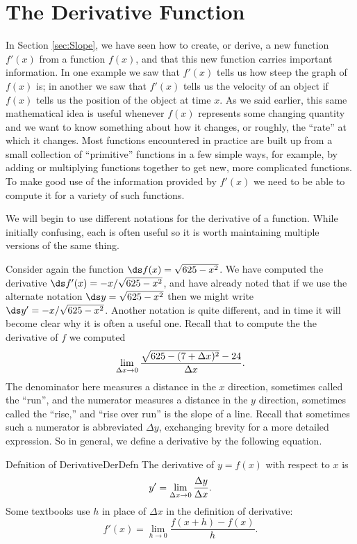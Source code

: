 \section{The Derivative Function}\label{sec:TheDerivativeFunction}
In Section \ref{sec:Slope}, we have seen how to create, or derive, a new function $f'(x)$ from a
function $f(x)$, and that this new function carries important
information. In one example we saw that $f'(x)$ tells us how steep the
graph of $f(x)$ is; in another we saw that $f'(x)$ tells us the velocity
of an object if $f(x)$ tells us the  position of the object at time
$x$. As we said earlier, this same mathematical idea is useful
whenever $f(x)$ represents some changing quantity and we want to know
something about how it changes, or roughly, the ``rate'' at which it
changes. Most functions encountered in practice are built up from a
small collection of ``primitive'' functions in a few simple ways, for
example, by adding or multiplying functions together to get new, more
complicated functions. To make good use of the information provided by
$f'(x)$ we need to be able to compute it for a variety of such functions.

We will begin to use different notations for the derivative of a
function. While initially confusing, each is often useful so it is
worth maintaining multiple versions of the same thing.

Consider again the function $\ds f(x)=\sqrt{625-x^2}$.
We have computed the derivative $\ds f'(x)=-x/\sqrt{625-x^2}$, and have
already noted that if we use the alternate notation
$\ds y=\sqrt{625-x^2}$ then we might write $\ds y'=-x/\sqrt{625-x^2}$.
Another notation is quite different, and in time it will become clear
why it is often a useful one. Recall that to compute the the
derivative of $f$ we computed 
$$
\lim_{\Delta x\to0} {\sqrt{625-(7+\Delta x)^2} - 24\over \Delta x}.
$$
The denominator here measures a distance in the $x$ direction,
sometimes called the ``run'', and the numerator measures a distance in
the $y$ direction, sometimes called the ``rise,'' and ``rise over
run'' is the slope of a line. Recall that sometimes such a numerator is
abbreviated $\Delta y$, exchanging brevity for a more detailed
expression. So in general, we define a derivative by the following equation.

\begin{definition}{Defnition of Derivative}{DerDefn}
The derivative of $y=f(x)$ with respect to $x$ is
$$y'=\lim_{\Delta x\to0} {\Delta y\over \Delta x}.$$
Some textbooks use $h$ in place of $\Delta x$ in the definition of
derivative: $$f'(x)=\lim_{h\to 0}\frac{f(x+h)-f(x)}{h}.$$ 
\end{definition}

